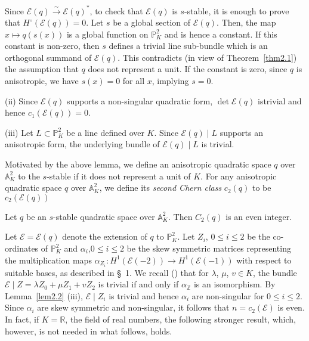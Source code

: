 \begin{Proof}
Since $\mathscr{E}(q)\xrightarrow{\sim}\mathscr{E}(q)^{\ast}$, to check that $\mathscr{E}(q)$ is $s$-stable, it is enough to prove that $H^{\circ}(\mathscr{E}(q))=0$. Let $s$ be a global section of $\mathscr{E}(q)$. Then, the map $x\mapsto q(s(x))$ is a global function on $\mathbb{P}^{2}_K$ and is hence a constant. If this constant is non-zero, then $s$ defines a trivial line sub-bundle which is an orthogonal summand of $\mathscr{E}(q)$. This contradicts (in view of Theorem~\ref{thm2.1}) the assumption that $q$ does not represent a unit. If the constant is zero, since $q$ is anisotropic, we have $s(x)=0$ for all $x$, implying $s=0$. 

(ii) Since $\mathscr{E}(q)$ supports a non-singular quadratic form, $\det \mathscr{E}(q)$ is\pageoriginale trivial and hence $c_1(\mathscr{E}(q))=0$. 

(iii) Let $L\subset \mathbb{P}^{2}_K$ be a line defined over $K$. Since $\mathscr{E}(q)\mid L$ supports an anisotropic form, the underlying bundle of $\mathscr{E}(q)\mid L$ is trivial. 

Motivated by the above lemma, we define an anisotropic quadratic space $q$ over $\mathbb{A}^{2}_K$ to the $s$-stable if it does not represent a unit of $K$. For any anisotropic quadratic space $q$ over $\mathbb{A}^{2}_K$, we define its \textit{second Chern class} $c_2(q)$ to be $c_2(\mathscr{E}(q))$ 
\end{Proof}

\begin{Prop}\label{Prop2.3}
Let $q$ be an $s$-stable quadratic space over $\mathbb{A}^{2}_K$. Then $C_2(q)$ is an even integer. 
\end{Prop}

\begin{Proof}
Let $\mathscr{E}=\mathscr{E}(q)$ denote the extension of $q$ to $\mathbb{P}^{2}_K$. Let $Z_i$, $0\leq i\leq 2$ be the co-ordinates of $\mathbb{P}^{2}_K$ and $\alpha_i$,$ 0\leq i\leq 2$ be the skew symmetric matrices representing the multiplication maps $\alpha_{Z_{i}}:H^{1}(\mathscr{E}(-2))\to H^{1}(\mathscr{E}(-1))$ with respect to suitable bases, as described in \S\ 1. We recall (\cite[\S\ 1.7.1]{key4}) that for $\lambda$, $\mu$, $v\in K$, the bundle $\mathscr{E}\mid Z=\lambda Z_0+\mu Z_1+vZ_2$ is trivial if and only if $\alpha_{\mathbb{Z}}$ is an isomorphism. By Lemma~\ref{lem2.2} (iii), $\mathscr{E}\mid Z_i$ is trivial and  hence $\alpha_i$ are non-singular for $0\leq i\leq 2$. Since $\alpha_i$ are skew symmetric and non-singular, it follows that $n=c_2(\mathscr{E})$  is even. In fact, if $K=\mathbb{R}$, the field of real numbers, the following stronger result, which, however, is not needed in what follows, holds.
\end{Proof}

